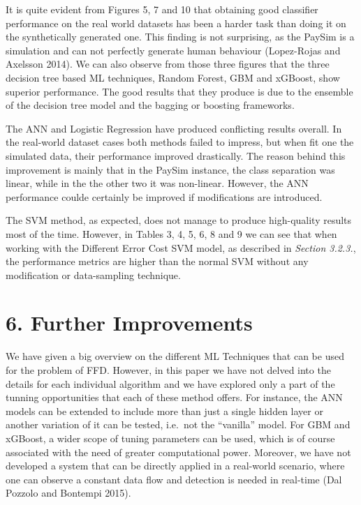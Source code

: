 \documentclass[12pt,]{article}
\begin{document}
It is quite evident from Figures 5, 7 and 10 that obtaining good
classifier performance on the real world datasets has been a harder task
than doing it on the synthetically generated one. This finding is not
surprising, as the PaySim is a simulation and can not perfectly generate
human behaviour (Lopez-Rojas and Axelsson 2014). We can also observe
from those three figures that the three decision tree based ML
techniques, Random Forest, GBM and xGBoost, show superior performance.
The good results that they produce is due to the ensemble of the
decision tree model and the bagging or boosting frameworks.

The ANN and Logistic Regression have produced conflicting results
overall. In the real-world dataset cases both methods failed to impress,
but when fit one the simulated data, their performance improved
drastically. The reason behind this improvement is mainly that in the
PaySim instance, the class separation was linear, while in the the other
two it was non-linear. However, the ANN performance coulde certainly be
improved if modifications are introduced.

The SVM method, as expected, does not manage to produce high-quality
results most of the time. However, in Tables 3, 4, 5, 6, 8 and 9 we can
see that when working with the Different Error Cost SVM model, as
described in \emph{Section 3.2.3.}, the performance metrics are higher
than the normal SVM without any modification or data-sampling technique.

\hypertarget{further-improvements}{%
\section{6. Further Improvements}\label{further-improvements}}

We have given a big overview on the different ML Techniques that can be
used for the problem of FFD. However, in this paper we have not delved
into the details for each individual algorithm and we have explored only
a part of the tunning opportunities that each of these method offers.
For instance, the ANN models can be extended to include more than just a
single hidden layer or another variation of it can be tested, i.e.~not
the ``vanilla'' model. For GBM and xGBoost, a wider scope of tuning
parameters can be used, which is of course associated with the need of
greater computational power. Moreover, we have not developed a system
that can be directly applied in a real-world scenario, where one can
observe a constant data flow and detection is needed in real-time (Dal
Pozzolo and Bontempi 2015).
\end{document}
